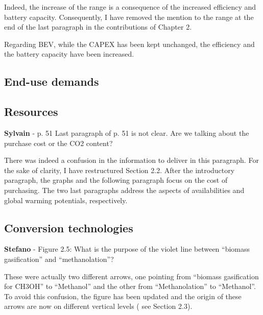 \documentclass[12pt,a4paper]{article}
\begin{document}
\noindent Indeed, the increase of the range is a consequence of the increased efficiency and battery capacity. Consequently, I have removed the mention to the range {\color{blue}at the end of the last paragraph in the contributions of Chapter 2}.

\begin{mdframed}[style=manuscript] %
Regarding BEV, while the CAPEX has been kept unchanged, the efficiency and the battery capacity have been increased. 
\end{mdframed}

\subsection{End-use demands}
\label{methodo_eud}

\subsection{Resources}
\label{methodo_resources}

\begin{mdframed}[style=comment] %
{\color{purple} \textbf{Sylvain}} - p. 51 Last paragraph of p. 51 is not clear. Are we talking about the purchase cost or the CO2 content?
\end{mdframed}

\noindent There was indeed a confusion in the information to deliver in this paragraph. For the sake of clarity, I have restructured Section 2.2. After the introductory paragraph, the graphs and the following paragraph focus on the cost of purchasing. The two last paragraphs address the aspects of availabilities and global warming potentials, respectively.

\subsection{Conversion technologies}
\label{methodo_technologies}

\begin{mdframed}[style=comment] %
{\color{orange} \textbf{Stefano}} - Figure 2.5: What is the purpose of the violet line between ``biomass gasification'' and ``methanolation''?
\end{mdframed}

\noindent These were actually two different arrows, one pointing from ``biomass gasification for CH3OH'' to ``Methanol'' and the other from ``Methanolation'' to ``Methanol''. To avoid this confusion, the figure has been updated and the origin of these arrows are now on different vertical levels ({\color{blue} see Section 2.3}).
\end{document}
